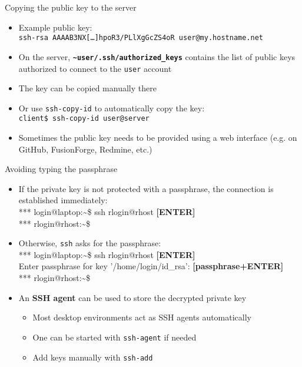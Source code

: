 \documentclass[11pt,final,usepdftitle=false]{beamer}
\newcommand{\tilda}{\textasciitilde{}}
\begin{document}
\begin{frame}{Copying the public key to the server}
\begin{itemize}
\item Example public key:\\
	{\footnotesize \texttt{ssh-rsa AAAAB3NX[\ldots]hpoR3/PLlXgGcZS4oR user@my.hostname.net}}
\hbr

\item On the server, \texttt{\bf \tilda{}user/.ssh/authorized\_keys} contains
	the list of public keys authorized to connect to the \texttt{user} account

\hbr
\item The key can be copied manually there
\hbr
\item Or use \texttt{ssh-copy-id} to automatically copy the key:\\
	\texttt{client\$ ssh-copy-id user@server}
\hbr
\item Sometimes the public key needs to be provided using a web interface (e.g. on GitHub, FusionForge, Redmine, etc.)
\end{itemize}
\end{frame}

\begin{frame}{Avoiding typing the passphrase}
\begin{itemize}
\item If the private key is not protected with a passphrase, the connection is established immediately:\\ \hbr
{\ttfamily\footnotesize 
*** login@laptop:\tilda\$  ssh rlogin@rhost \textbf{ [ENTER]}\\
*** rlogin@rhost:\tilda\$\\ }
\hbr
\item Otherwise, \texttt{ssh} asks for the passphrase:\\ \hbr
{\ttfamily\footnotesize 
*** login@laptop:\tilda\$ ssh rlogin@rhost \textbf{ [ENTER]}\\
Enter passphrase for key '/home/login/id\_rsa':  \textbf{[passphrase+ENTER]}\\ 
*** rlogin@rhost:\tilda\$\\ }
\hbr
\item An \textbf{SSH agent} can be used to store the decrypted private key
\begin{itemize}
	\item Most desktop environments act as SSH agents automatically
	\item One can be started with \texttt{ssh-agent} if needed
	\item Add keys manually with \texttt{ssh-add}
\end{itemize}
\end{itemize}
\end{frame}
\end{document}
